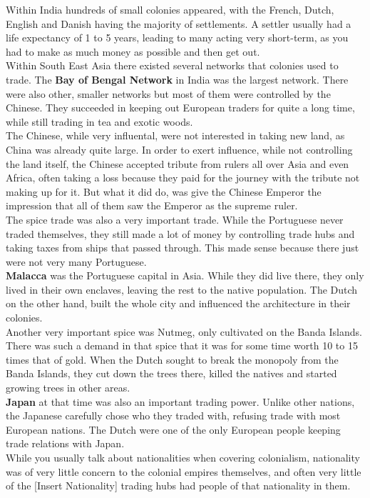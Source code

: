 \documentclass{article}
\begin{document}
	Within India hundreds of small colonies appeared, with the French, Dutch, English and Danish having the majority of settlements. A settler usually had a life expectancy of 1 to 5 years, leading to many acting very short-term, as you had to make as much money as possible and then get out. \\
	Within South East Asia there existed several networks that colonies used to trade. The \textbf{Bay of Bengal Network} in India was the largest network. There were also other, smaller networks but most of them were controlled by the Chinese. They succeeded in keeping out European traders for quite a long time, while still trading in tea and exotic woods. \\
	The Chinese, while very influental, were not interested in taking new land, as China was already quite large. In order to exert influence, while not controlling the land itself, the Chinese accepted tribute from rulers all over Asia and even Africa, often taking a loss because they paid for the journey with the tribute not making up for it. But what it did do, was give the Chinese Emperor the impression that all of them saw the Emperor as the supreme ruler. \\
	The spice trade was also a very important trade. While the Portuguese never traded themselves, they still made a lot of money by controlling trade hubs and taking taxes from ships that passed through. This made sense because there just were not very many Portuguese. \\
	\textbf{Malacca} was the Portuguese capital in Asia. While they did live there, they only lived in their own enclaves, leaving the rest to the native population. The Dutch on the other hand, built the whole city and influenced the architecture in their colonies. \\
	Another very important spice was Nutmeg, only cultivated on the Banda Islands. There was such a demand in that spice that it was for some time worth 10 to 15 times that of gold. When the Dutch sought to break the monopoly from the Banda Islands, they cut down the trees there, killed the natives and started growing trees in other areas. \\
	\textbf{Japan} at that time was also an important trading power. Unlike other nations, the Japanese carefully chose who they traded with, refusing trade with most European nations. The Dutch were one of the only European people keeping trade relations with Japan. \\
	While you usually talk about nationalities when covering colonialism, nationality was of very little concern to the colonial empires themselves, and often very little of the [Insert Nationality] trading hubs had people of that nationality in them. \\
\end{document}
